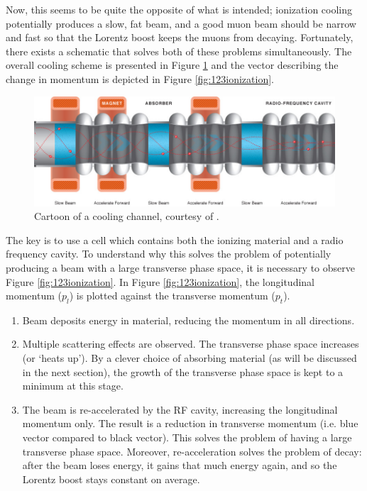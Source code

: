 Now, this seems to be quite the opposite of what is intended; ionization cooling potentially produces a slow, fat beam, and a good muon beam should be narrow and fast so that the Lorentz boost keeps the muons from decaying. Fortunately, there exists a schematic that solves both of these problems simultaneously. The overall cooling scheme is presented in  Figure \ref{fig:coolingchannel} and the vector describing the change in momentum is depicted in Figure \ref{fig:123ionization}.
\begin{figure}
  \begin{center} 
    \includegraphics[width=\textwidth]{Figures/coolingchannel} 
  \caption{Cartoon of a cooling channel, courtesy of \cite{map}.}
  \label{fig:coolingchannel}
 \end{center}
\end{figure}

The key is to use a cell which contains both the ionizing material and a radio frequency cavity. To understand why this solves the problem of potentially producing a beam with a large transverse phase space, it is necessary to observe Figure \ref{fig:123ionization}. In Figure \ref{fig:123ionization}, the longitudinal momentum ($p_l$) is plotted against the transverse momentum ($p_t$). 
   \begin{enumerate} 
  \item{Beam deposits energy in material, reducing the momentum in all directions.}
  \item{Multiple scattering effects are observed. The transverse phase space increases (or `heats up'). By a clever choice of absorbing material (as will be discussed in the next section), the growth of the transverse phase space is kept to a minimum at this stage.}
  \item{The beam is re-accelerated by the RF cavity, increasing the longitudinal momentum only. The result is a reduction in transverse momentum (i.e. blue vector compared to black vector). This solves the problem of having a large transverse phase space. Moreover, re-acceleration solves the problem of decay: after the beam loses energy, it gains that much energy again, and so the Lorentz boost stays constant on average.}
\end{enumerate}


